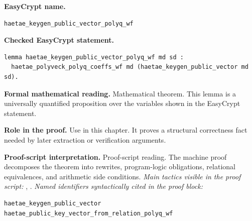 \begin{formaltheorem}
\noindent\textbf{EasyCrypt name.}
\begin{lstlisting}[language=EasyCrypt,basicstyle=\ttfamily\scriptsize]
haetae_keygen_public_vector_polyq_wf
\end{lstlisting}
\noindent\textbf{Checked EasyCrypt statement.}
\begin{lstlisting}[language=EasyCrypt,basicstyle=\ttfamily\scriptsize]
lemma haetae_keygen_public_vector_polyq_wf md sd :
  haetae_polyveck_polyq_coeffs_wf md (haetae_keygen_public_vector md sd).
\end{lstlisting}
\noindent\textbf{Formal mathematical reading.}
Mathematical theorem. This lemma is a universally quantified proposition over the variables shown in the EasyCrypt statement.

\noindent\textbf{Role in the proof.}
Use in this chapter. It proves a structural correctness fact needed by later extraction or verification arguments.

\noindent\textbf{Proof-script interpretation.}
Proof-script reading. The machine proof decomposes the theorem into rewrites, program-logic obligations, relational equivalences, and arithmetic side conditions.
\emph{Main tactics visible in the proof script:} , .
\emph{Named identifiers syntactically cited in the proof block:}
\begin{lstlisting}[language=EasyCrypt,basicstyle=\ttfamily\scriptsize]
haetae_keygen_public_vector
haetae_public_key_vector_from_relation_polyq_wf
\end{lstlisting}

\end{formaltheorem}

